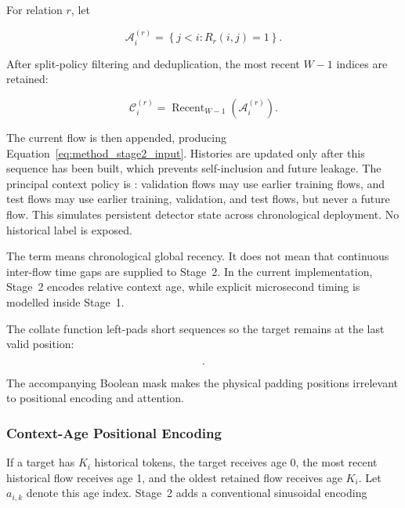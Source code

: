 For relation $r$, let

\begin{equation}
    \mathcal{A}^{(r)}_i
    =\left\{j<i:R_r(i,j)=1\right\}.
    \label{eq:method_eligible_context}
\end{equation}

After split-policy filtering and deduplication, the most recent $W-1$ indices
are retained:

\begin{equation}
    \mathcal{C}^{(r)}_i
    =\operatorname{Recent}_{W-1}
      \left(\mathcal{A}^{(r)}_i\right).
    \label{eq:recent_context}
\end{equation}

The current flow is then appended, producing
Equation~\ref{eq:method_stage2_input}. Histories are updated only after this
sequence has been built, which prevents self-inclusion and future leakage. The
principal context policy is : validation flows may use
earlier training flows, and test flows may use earlier training, validation,
and test flows, but never a future flow. This simulates persistent detector
state across chronological deployment. No historical label is exposed.

The term  means chronological global recency. It does
not mean that continuous inter-flow time gaps are supplied to Stage~2. In the
current implementation, Stage~2 encodes relative context age, while explicit
microsecond timing is modelled inside Stage~1.

The collate function left-pads short sequences so the target remains at the last
valid position:

\begin{equation}
    [\mathrm{PAD},\ldots,\mathrm{PAD},
      \mathbf{z}^{(1)}_{j_1},\ldots,
      \mathbf{z}^{(1)}_{j_{K_i}},
      \mathbf{z}^{(1)}_i].
    \label{eq:left_padded_context}
\end{equation}

The accompanying Boolean mask makes the physical padding positions irrelevant
to positional encoding and attention.

\subsubsection{Context-Age Positional Encoding}
\label{subsubsec:context_age_encoding}

If a target has $K_i$ historical tokens, the target receives age 0, the most
recent historical flow receives age 1, and the oldest retained flow receives
age $K_i$. Let $a_{i,k}$ denote this age index. Stage~2 adds a conventional
sinusoidal encoding

